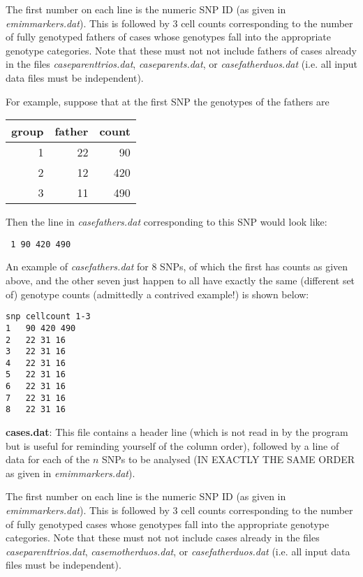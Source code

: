 \documentclass[a4paper,11pt]{report}
\begin{document}
The first number on each line is the numeric SNP ID (as given in {\it emimmarkers.dat}). This is followed by 3 cell counts corresponding to the number
of fully genotyped fathers of cases whose genotypes 
fall into the appropriate genotype categories. Note that these
must not not include fathers of cases already
in the files {\it  caseparenttrios.dat}, {\it  caseparents.dat},
or {\it  casefatherduos.dat} (i.e. all input data files must be
independent).


For example, suppose that at the first SNP the genotypes of the fathers are

\begin{tabular}{rrr} 
group    &   father &count \\ \hline
1     &  22   &   90\\
2     &  12   &   420\\
3     &  11   &   490\\
\end{tabular}

Then the line in	{\it  casefathers.dat} corresponding to this SNP 
would look like:

{\tt
1 	90 420 490
}

An example of {\it  casefathers.dat} for 8 SNPs, of which the first has counts as given above, and the other seven just happen to all have exactly the same (different set of) genotype counts (admittedly a contrived example!) is shown below:

\begin{verbatim}
snp	cellcount 1-3
1 	90 420 490
2 	22 31 16
3 	22 31 16
4 	22 31 16
5 	22 31 16
6 	22 31 16
7 	22 31 16
8 	22 31 16
\end{verbatim}
 
\bigskip

	{\bf  cases.dat}:  This file contains a header line
(which is not read in by the program but is useful for reminding
yourself of the  column order), followed by a line of data
for each of the $n$ SNPs to be analysed (IN EXACTLY THE SAME ORDER
as given in {\it emimmarkers.dat}).

The first number on each line is the numeric SNP ID (as given in {\it emimmarkers.dat}). This is followed by 3 cell counts corresponding to the number
of fully genotyped cases whose genotypes 
fall into the appropriate genotype categories. Note that these
must not not include cases already
in the files {\it  caseparenttrios.dat}, {\it  casemotherduos.dat},
or {\it  casefatherduos.dat} (i.e. all input data files must be
independent).
\end{document}
